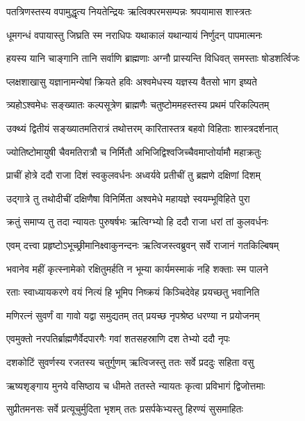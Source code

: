 \twolineshloka
{पतत्रिणस्तस्य वपामुद्धृत्य नियतेन्द्रियः}
{ऋत्विक्परमसम्पन्नः श्रपयामास शास्त्रतः} %

\twolineshloka
{धूमगन्धं वपायास्तु जिघ्रति स्म नराधिपः}
{यथाकालं यथान्यायं निर्णुदन् पापमात्मनः} %

\twolineshloka
{हयस्य यानि चाङ्गानि तानि सर्वाणि ब्राह्मणाः}
{अग्नौ प्रास्यन्ति विधिवत् समस्ताः षोडशर्त्विजः} %

\twolineshloka
{प्लक्षशाखासु यज्ञानामन्येषां क्रियते हविः}
{अश्वमेधस्य यज्ञस्य वैतसो भाग इष्यते} %

\twolineshloka
{त्र्यहोऽश्वमेधः सङ्ख्यातः कल्पसूत्रेण ब्राह्मणैः}
{चतुष्टोममहस्तस्य प्रथमं परिकल्पितम्} %

\twolineshloka
{उक्थ्यं द्वितीयं सङ्ख्यातमतिरात्रं तथोत्तरम्}
{कारितास्तत्र बहवो विहिताः शास्त्रदर्शनात्} %

\twolineshloka
{ज्योतिष्टोमायुषी चैवमतिरात्रौ च निर्मितौ}
{अभिजिद्विश्वजिच्चैवमाप्तोर्यामौ महाक्रतुः} %

\twolineshloka
{प्राचीं होत्रे ददौ राजा दिशं स्वकुलवर्धनः}
{अध्वर्यवे प्रतीचीं तु ब्रह्मणे दक्षिणां दिशम्} %

\twolineshloka
{उद्गात्रे तु तथोदीचीं दक्षिणैषा विनिर्मिता}
{अश्वमेधे महायज्ञे स्वयम्भूविहिते पुरा} %

\twolineshloka
{क्रतुं समाप्य तु तदा न्यायतः पुरुषर्षभः}
{ऋत्विग्भ्यो हि ददौ राजा धरां तां कुलवर्धनः} %

\twolineshloka
{एवम् दत्त्वा प्रहृष्टोऽभूच्छ्रीमानिक्ष्वाकुनन्दनः}
{ऋत्विजस्त्वब्रुवन् सर्वे राजानं गतकिल्बिषम्} %

\twolineshloka
{भवानेव महीं कृत्स्नामेको रक्षितुमर्हति}
{न भूम्या कार्यमस्माकं नहि शक्ताः स्म पालने} %

\twolineshloka
{रताः स्वाध्यायकरणे वयं नित्यं हि भूमिप}
{निष्क्रयं किञ्चिदेवेह प्रयच्छतु भवानिति} %

\twolineshloka
{मणिरत्नं सुवर्णं वा गावो यद्वा समुद्यतम्}
{तत् प्रयच्छ नृपश्रेष्ठ धरण्या न प्रयोजनम्} %

\twolineshloka
{एवमुक्तो नरपतिर्ब्राह्मणैर्वेदपारगैः}
{गवां शतसहस्राणि दश तेभ्यो ददौ नृपः} %

\twolineshloka
{दशकोटिं सुवर्णस्य रजतस्य चतुर्गुणम्}
{ऋत्विजस्तु ततः सर्वे प्रददुः सहिता वसु} %

\twolineshloka
{ऋष्यशृङ्गाय मुनये वसिष्ठाय च धीमते}
{ततस्ते न्यायतः कृत्वा प्रविभागं द्विजोत्तमाः} %

\twolineshloka
{सुप्रीतमनसः सर्वे प्रत्यूचुर्मुदिता भृशम्}
{ततः प्रसर्पकेभ्यस्तु हिरण्यं सुसमाहितः} %


